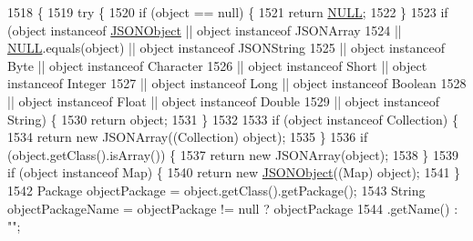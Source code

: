 \begin{DoxyCode}
1518                                              \{
1519         \textcolor{keywordflow}{try} \{
1520             \textcolor{keywordflow}{if} (\textcolor{keywordtype}{object} == null) \{
1521                 \textcolor{keywordflow}{return} \hyperlink{classorg_1_1json_1_1_j_s_o_n_object_a01c74a31a1abfd34ab13beb9347855ac}{NULL};
1522             \}
1523             \textcolor{keywordflow}{if} (\textcolor{keywordtype}{object} instanceof \hyperlink{classorg_1_1json_1_1_j_s_o_n_object_a7c17e59daff74ce50c6677c6f5da233d}{JSONObject} || \textcolor{keywordtype}{object} instanceof JSONArray
1524                     || \hyperlink{classorg_1_1json_1_1_j_s_o_n_object_a01c74a31a1abfd34ab13beb9347855ac}{NULL}.equals(\textcolor{keywordtype}{object}) || \textcolor{keywordtype}{object} instanceof JSONString
1525                     || \textcolor{keywordtype}{object} instanceof Byte || \textcolor{keywordtype}{object} instanceof Character
1526                     || \textcolor{keywordtype}{object} instanceof Short || \textcolor{keywordtype}{object} instanceof Integer
1527                     || \textcolor{keywordtype}{object} instanceof Long || \textcolor{keywordtype}{object} instanceof Boolean
1528                     || \textcolor{keywordtype}{object} instanceof Float || \textcolor{keywordtype}{object} instanceof Double
1529                     || \textcolor{keywordtype}{object} instanceof String) \{
1530                 \textcolor{keywordflow}{return} object;
1531             \}
1532 
1533             \textcolor{keywordflow}{if} (\textcolor{keywordtype}{object} instanceof Collection) \{
1534                 \textcolor{keywordflow}{return} \textcolor{keyword}{new} JSONArray((Collection) \textcolor{keywordtype}{object});
1535             \}
1536             \textcolor{keywordflow}{if} (\textcolor{keywordtype}{object}.getClass().isArray()) \{
1537                 \textcolor{keywordflow}{return} \textcolor{keyword}{new} JSONArray(\textcolor{keywordtype}{object});
1538             \}
1539             \textcolor{keywordflow}{if} (\textcolor{keywordtype}{object} instanceof Map) \{
1540                 \textcolor{keywordflow}{return} \textcolor{keyword}{new} \hyperlink{classorg_1_1json_1_1_j_s_o_n_object_a7c17e59daff74ce50c6677c6f5da233d}{JSONObject}((Map) \textcolor{keywordtype}{object});
1541             \}
1542             Package objectPackage = \textcolor{keywordtype}{object}.getClass().getPackage();
1543             String objectPackageName = objectPackage != null ? objectPackage
1544                     .getName() : \textcolor{stringliteral}{""};

\end{DoxyCode}
